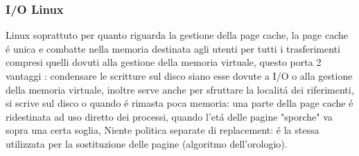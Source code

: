 \subsubsection*{I/O Linux}
Linux soprattuto per quanto riguarda la gestione della page cache, la page cache é unica e combatte nella memoria destinata agli utenti per tutti i trasferimenti compresi quelli dovuti alla gestione della memoria
virtuale, questo porta 2 vantaggi : condensare le scritture sul disco siano esse dovute a I/O o alla gestione della memoria virtuale, inoltre
serve anche per sfruttare la localitá dei riferimenti, si scrive sul disco o quando é rimasta poca memoria: una parte della page cache
é ridestinata ad uso diretto dei processi, quando l'etá delle pagine "sporche"  va sopra una certa soglia,
Niente politica separate di replacement:  é la stessa utilizzata per la sostituzione delle pagine (algoritmo dell'orologio).


































































